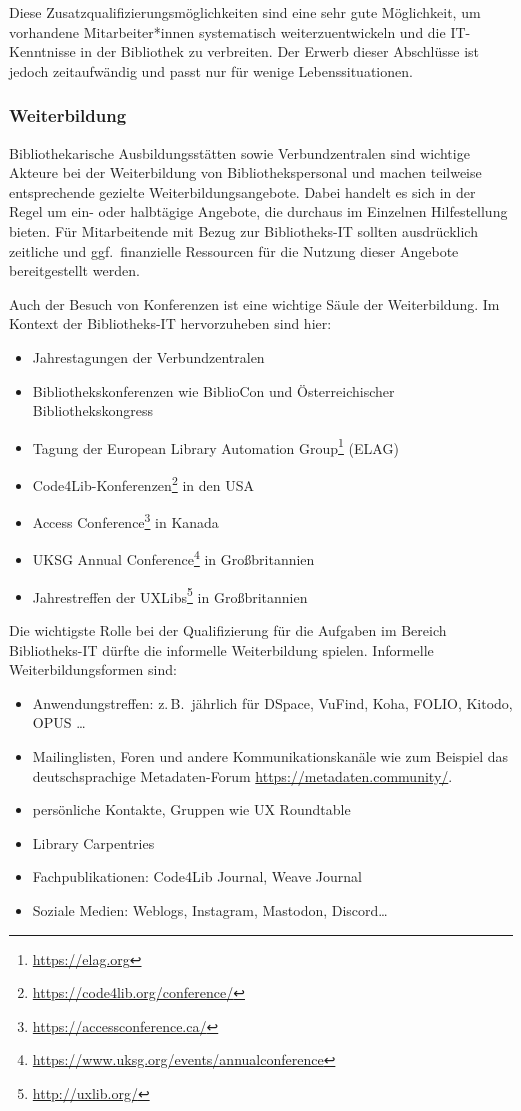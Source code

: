 \documentclass[
  11pt,
  letterpaper,
  DIV=11,
  twoside]{scrreprt}
\DeclareRobustCommand{\href}[2]{#2\footnote{\url{#1}}}
\begin{document}
Diese Zusatzqualifizierungsmöglichkeiten sind eine sehr gute
Möglichkeit, um vorhandene Mitarbeiter*innen systematisch
weiterzuentwickeln und die IT-Kenntnisse in der Bibliothek zu
verbreiten. Der Erwerb dieser Abschlüsse ist jedoch zeitaufwändig und
passt nur für wenige Lebenssituationen.

\subsubsection{Weiterbildung}\label{weiterbildung}

Bibliothekarische Ausbildungsstätten sowie Verbundzentralen sind
wichtige Akteure bei der Weiterbildung von Bibliothekspersonal und
machen teilweise entsprechende gezielte Weiterbildungsangebote. Dabei
handelt es sich in der Regel um ein- oder halbtägige Angebote, die
durchaus im Einzelnen Hilfestellung bieten. Für Mitarbeitende mit Bezug
zur Bibliotheks-IT sollten ausdrücklich zeitliche und ggf.~finanzielle
Ressourcen für die Nutzung dieser Angebote bereitgestellt werden.

Auch der Besuch von Konferenzen ist eine wichtige Säule der
Weiterbildung. Im Kontext der Bibliotheks-IT hervorzuheben sind hier:

\begin{itemize}
\item
  Jahrestagungen der Verbundzentralen
\item
  Bibliothekskonferenzen wie BiblioCon und Österreichischer
  Bibliothekskongress
\item
  Tagung der \href{https://elag.org}{European Library Automation Group}
  (ELAG)
\item
  \href{https://code4lib.org/conference/}{Code4Lib-Konferenzen} in den
  USA
\item
  \href{https://accessconference.ca/}{Access Conference} in Kanada
\item
  \href{https://www.uksg.org/events/annualconference}{UKSG Annual
  Conference} in Großbritannien
\item
  Jahrestreffen der \href{http://uxlib.org/}{UXLibs} in Großbritannien
\end{itemize}

Die wichtigste Rolle bei der Qualifizierung für die Aufgaben im Bereich
Bibliotheks-IT dürfte die informelle Weiterbildung spielen. Informelle
Weiterbildungsformen sind:

\begin{itemize}
\item
  Anwendungstreffen: z.\,B.~jährlich für DSpace, VuFind, Koha, FOLIO,
  Kitodo, OPUS \ldots{}
\item
  Mailinglisten, Foren und andere Kommunikationskanäle wie zum Beispiel
  das deutschsprachige Metadaten-Forum
  \url{https://metadaten.community/}.
\item
  persönliche Kontakte, Gruppen wie UX Roundtable
\item
  Library Carpentries
\item
  Fachpublikationen: Code4Lib Journal, Weave Journal
\item
  Soziale Medien: Weblogs, Instagram, Mastodon, Discord\ldots{}
\end{itemize}
\end{document}
